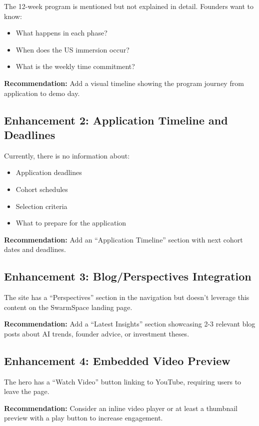 \documentclass[12pt,a4paper]{article}
\begin{document}
The 12-week program is mentioned but not explained in detail. Founders want to know:
\begin{itemize}
    \item What happens in each phase?
    \item When does the US immersion occur?
    \item What is the weekly time commitment?
\end{itemize}

\textbf{Recommendation:} Add a visual timeline showing the program journey from application to demo day.

\subsection{Enhancement 2: Application Timeline and Deadlines}

Currently, there is no information about:
\begin{itemize}
    \item Application deadlines
    \item Cohort schedules
    \item Selection criteria
    \item What to prepare for the application
\end{itemize}

\textbf{Recommendation:} Add an ``Application Timeline'' section with next cohort dates and deadlines.

\subsection{Enhancement 3: Blog/Perspectives Integration}

The site has a ``Perspectives'' section in the navigation but doesn't leverage this content on the SwarmSpace landing page.

\textbf{Recommendation:} Add a ``Latest Insights'' section showcasing 2-3 relevant blog posts about AI trends, founder advice, or investment theses.

\subsection{Enhancement 4: Embedded Video Preview}

The hero has a ``Watch Video'' button linking to YouTube, requiring users to leave the page.

\textbf{Recommendation:} Consider an inline video player or at least a thumbnail preview with a play button to increase engagement.
\end{document}
